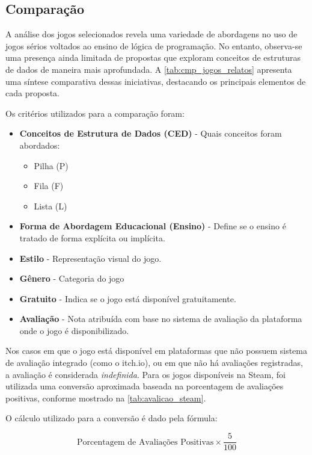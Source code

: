 \subsection{Comparação}

A análise dos jogos selecionados revela uma variedade de abordagens no uso de jogos sérios voltados ao ensino de lógica de programação. No entanto, observa-se uma presença ainda limitada de propostas que exploram conceitos de estruturas de dados de maneira mais aprofundada. A \autoref{tab:cmp_jogos_relatos} apresenta uma síntese comparativa dessas iniciativas, destacando os principais elementos de cada proposta.

Os critérios utilizados para a comparação foram:

\begin{itemize}
  \item \textbf{Conceitos de Estrutura de Dados (CED)} - Quais conceitos foram abordados:
  \begin{itemize}
    \item Pilha (P)
    \item Fila (F)
    \item Lista (L)
  \end{itemize}
  \item \textbf{Forma de Abordagem Educacional (Ensino)} - Define se o ensino é tratado de forma explícita ou implícita.
  \item \textbf{Estilo} - Representação visual do jogo.
  \item \textbf{Gênero} - Categoria do jogo
  \item \textbf{Gratuito} - Indica se o jogo está disponível gratuitamente.
  \item \textbf{Avaliação} - Nota atribuída com base no sistema de avaliação da plataforma onde o jogo é disponibilizado.
\end{itemize}

Nos casos em que o jogo está disponível em plataformas que não possuem sistema de avaliação integrado (como o itch.io), ou em que não há avaliações registradas, a avaliação é considerada \textit{indefinida}. Para os jogos disponíveis na Steam, foi utilizada uma conversão aproximada baseada na porcentagem de avaliações positivas, conforme mostrado na \autoref{tab:avalicao_steam}.





O cálculo utilizado para a conversão é dado pela fórmula:

\[
	\text{Porcentagem de Avaliações Positivas} \times \frac{5}{100}
\]
